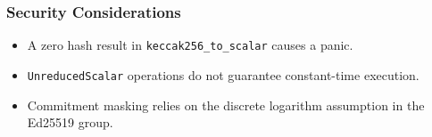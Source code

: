 \subsubsection{Security Considerations}

\begin{itemize}
  \item A zero hash result in \texttt{keccak256\_to\_scalar} causes a panic.  %
  \item \texttt{UnreducedScalar} operations do not guarantee constant-time execution.  %
  \item Commitment masking relies on the discrete logarithm assumption in the Ed25519 group.  %
\end{itemize}

